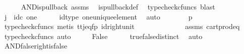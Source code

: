 \begin{isabellebody}
\ \ \ \ \isamarkupfalse%
\ AND{\isacharunderscore}{\kern0pt}is{\isacharunderscore}{\kern0pt}pullback\ assms\ \isamarkupfalse%
\ is{\isacharunderscore}{\kern0pt}pullback{\isacharunderscore}{\kern0pt}def\ \isamarkupfalse%
\ {\isacharparenleft}{\kern0pt}typecheck{\isacharunderscore}{\kern0pt}cfuncs{\isacharcomma}{\kern0pt}\ blast{\isacharparenright}{\kern0pt}\isanewline
\ \ \isamarkupfalse%
\ \isamarkupfalse%
\ {\isachardoublequoteopen}j\ {\isacharequal}{\kern0pt}\ id\isactrlsub c\ one{\isachardoublequoteclose}\isanewline
\ \ \ \ \isamarkupfalse%
\ id{\isacharunderscore}{\kern0pt}type\ one{\isacharunderscore}{\kern0pt}unique{\isacharunderscore}{\kern0pt}element\ \isamarkupfalse%
\ auto\isanewline
\ \ \isamarkupfalse%
\ \isamarkupfalse%
\ {\isachardoublequoteopen}{\isasymlangle}{\isasymt}{\isacharcomma}{\kern0pt}{\isasymt}{\isasymrangle}\ {\isacharequal}{\kern0pt}\ {\isasymlangle}{\isasymf}{\isacharcomma}{\kern0pt}p{\isasymrangle}{\isachardoublequoteclose}\isanewline
\ \ \ \ \isamarkupfalse%
\ {\isacharparenleft}{\kern0pt}typecheck{\isacharunderscore}{\kern0pt}cfuncs{\isacharcomma}{\kern0pt}\ metis\ tt{\isacharunderscore}{\kern0pt}j{\isacharunderscore}{\kern0pt}eq{\isacharunderscore}{\kern0pt}fp\ id{\isacharunderscore}{\kern0pt}right{\isacharunderscore}{\kern0pt}unit{}{\isacharparenright}{\kern0pt}\isanewline
\ \ \isamarkupfalse%
\ \isamarkupfalse%
\ {\isachardoublequoteopen}{\isasymt}\ {\isacharequal}{\kern0pt}\ {\isasymf}{\isachardoublequoteclose}\isanewline
\ \ \ \ \isamarkupfalse%
\ assms\ cart{\isacharunderscore}{\kern0pt}prod{\isacharunderscore}{\kern0pt}eq{}\ \isamarkupfalse%
\ {\isacharparenleft}{\kern0pt}typecheck{\isacharunderscore}{\kern0pt}cfuncs{\isacharcomma}{\kern0pt}\ auto{\isacharparenright}{\kern0pt}\isanewline
\ \ \isamarkupfalse%
\ \isamarkupfalse%
\ False\isanewline
\ \ \ \ \isamarkupfalse%
\ true{\isacharunderscore}{\kern0pt}false{\isacharunderscore}{\kern0pt}distinct\ \isamarkupfalse%
\ auto\isanewline
{}\isamarkupfalse%
%
\endisatagproof
{\isafoldproof}%
%
\isadelimproof
\isanewline
%
\endisadelimproof
\isanewline
{}\isamarkupfalse%
\ AND{\isacharunderscore}{\kern0pt}false{\isacharunderscore}{\kern0pt}right{\isacharunderscore}{\kern0pt}is{\isacharunderscore}{\kern0pt}false{\isacharcolon}{\kern0pt}\isanewline

\end{isabellebody}
